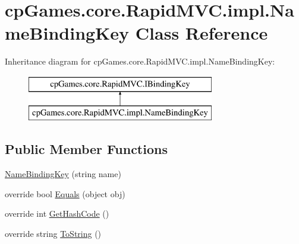 \hypertarget{classcp_games_1_1core_1_1_rapid_m_v_c_1_1impl_1_1_name_binding_key}{}\section{cp\+Games.\+core.\+Rapid\+M\+V\+C.\+impl.\+Name\+Binding\+Key Class Reference}
\label{classcp_games_1_1core_1_1_rapid_m_v_c_1_1impl_1_1_name_binding_key}
Inheritance diagram for cp\+Games.\+core.\+Rapid\+M\+V\+C.\+impl.\+Name\+Binding\+Key\+:\begin{figure}[H]
\begin{center}
\leavevmode
\includegraphics[height=2.000000cm]{classcp_games_1_1core_1_1_rapid_m_v_c_1_1impl_1_1_name_binding_key}
\end{center}
\end{figure}
\subsection*{Public Member Functions}
\begin{DoxyCompactItemize}
\item 
\mbox{\hyperlink{classcp_games_1_1core_1_1_rapid_m_v_c_1_1impl_1_1_name_binding_key_aee1ce8777d8fa0de47a8d878966c5359}{Name\+Binding\+Key}} (string name)
\item 
override bool \mbox{\hyperlink{classcp_games_1_1core_1_1_rapid_m_v_c_1_1impl_1_1_name_binding_key_a23148495945655699d812eb768e7bf5e}{Equals}} (object obj)
\item 
override int \mbox{\hyperlink{classcp_games_1_1core_1_1_rapid_m_v_c_1_1impl_1_1_name_binding_key_ae24c1e4b05e9810ede97df17adbfab70}{Get\+Hash\+Code}} ()
\item 
override string \mbox{\hyperlink{classcp_games_1_1core_1_1_rapid_m_v_c_1_1impl_1_1_name_binding_key_af76965c67dc7eb9377e27e55b6a8a1d5}{To\+String}} ()
\end{DoxyCompactItemize}

